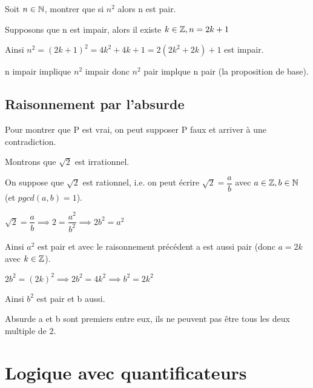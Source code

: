 \documentclass[a4paper, 12pt]{article}
\begin{document}
\begin{example}
    Soit $n \in \mathbb{N}$, montrer que si $n^2$ alors n est pair.

    \vspace{0.5em}

    Supposons que n est impair, alors il existe $k \in \mathbb{Z}, n = 2k + 1$

    Ainsi $n^2 = (2k + 1)^2 = 4k^2 + 4k + 1 = 2(2k^2 + 2k) + 1$ est impair.

    n impair implique $n^2$ impair donc $n^2$ pair implque n pair (la proposition de base).
\end{example}

\subsection{Raisonnement par l'absurde}

Pour montrer que P est vrai, on peut supposer P faux et arriver à une contradiction.

\begin{example}
    Montrons que $\sqrt{2}$ est irrationnel.

    \begin{demonstration}
        On suppose que $\sqrt{2}$ est rationnel, i.e. on peut écrire $\sqrt{2} = \dfrac{a}{b}$ avec $a \in \mathbb{Z}, b \in \mathbb{N}$ (et $pgcd(a, b) = 1$).

        $\sqrt{2} = \dfrac{a}{b} \implies 2 = \dfrac{a^2}{b^2} \implies 2b^2 = a^2$

        Ainsi $a^2$ est pair et avec le raisonnement précédent a est aussi pair (donc $a = 2k$ avec $k \in \mathbb{Z}$).

        $2b^2 = (2k)^2 \implies 2b^2 = 4k^2 \implies b^2 = 2k^2$

        Ainsi $b^2$ est pair et b aussi.

        \begin{rdem}
            Absurde a et b sont premiers entre eux, ils ne peuvent pas être tous les deux multiple de 2.
        \end{rdem}
    \end{demonstration}
\end{example}




\section{Logique avec quantificateurs}
\end{document}
